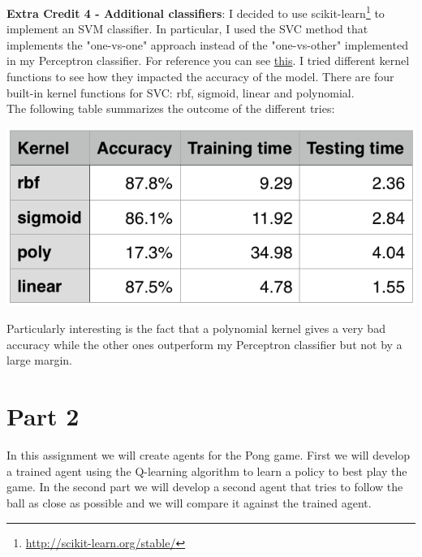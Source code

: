 \documentclass[11pt]{article}
\begin{document}
\textbf{Extra Credit 4 - Additional classifiers}: I decided to use scikit-learn\footnote{\url{http://scikit-learn.org/stable/}} to implement an SVM classifier. In particular, I used the SVC method that implements the "one-vs-one" approach instead of the "one-vs-other" implemented in my Perceptron classifier. For reference you can see \href{http://scikit-learn.org/stable/modules/generated/sklearn.svm.SVC.html#sklearn.svm.SVC}{this}. I tried different kernel functions to see how they impacted the accuracy of the model. There are four built-in kernel functions for SVC: rbf, sigmoid, linear and polynomial. \\

The following table summarizes the outcome of the different tries:
\begin{center}
\includegraphics[scale=0.80]{part1.ec4/summary.png}
\end{center}

Particularly interesting is the fact that a polynomial kernel gives a very bad accuracy while the other ones outperform my Perceptron classifier but not by a large margin.

\section*{Part 2}
In this assignment we will create agents for the Pong game. First we will develop a trained agent using the Q-learning algorithm to learn a policy to best play the game. In the second part we will develop a second agent that tries to follow the ball as close as possible and we will compare it against the trained agent. \\
\end{document}
